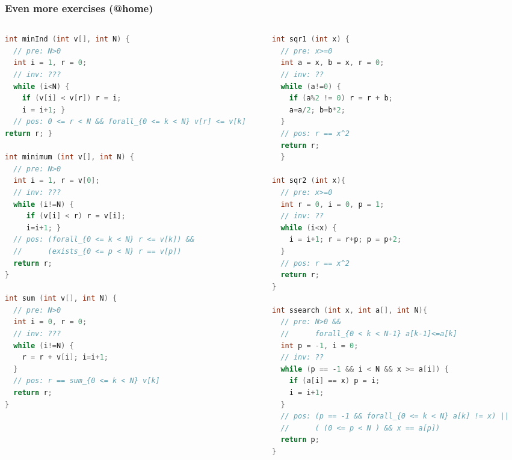 \documentclass[aspectratio=169]{beamer}
\begin{document}
\begin{frame}[fragile]\frametitle{Even more exercises (@home)}
\begin{columns}
\begin{column}{0.48\textwidth}
\begin{lstlisting}[language=C++,style=tiny]
int minInd (int v[], int N) {
  // pre: N>0
  int i = 1, r = 0;
  // inv: ???
  while (i<N) {
    if (v[i] < v[r]) r = i;
    i = i+1; }
  // pos: 0 <= r < N && forall_{0 <= k < N} v[r] <= v[k]
return r; }

int minimum (int v[], int N) {
  // pre: N>0
  int i = 1, r = v[0];
  // inv: ???
  while (i!=N) {
     if (v[i] < r) r = v[i];
     i=i+1; }
  // pos: (forall_{0 <= k < N} r <= v[k]) &&
  //      (exists_{0 <= p < N} r == v[p])
  return r;
}

int sum (int v[], int N) {
  // pre: N>0
  int i = 0, r = 0;
  // inv: ???
  while (i!=N) {
    r = r + v[i]; i=i+1;
  }
  // pos: r == sum_{0 <= k < N} v[k]
  return r;
}
\end{lstlisting}
\end{column}
\begin{column}{0.48\textwidth}
\begin{lstlisting}[language=C++,style=tiny]
int sqr1 (int x) {
  // pre: x>=0
  int a = x, b = x, r = 0;
  // inv: ??
  while (a!=0) {
    if (a%2 != 0) r = r + b;
    a=a/2; b=b*2;
  }
  // pos: r == x^2
  return r;
  }

int sqr2 (int x){
  // pre: x>=0
  int r = 0, i = 0, p = 1;
  // inv: ??
  while (i<x) {
    i = i+1; r = r+p; p = p+2;
  }
  // pos: r == x^2
  return r;
}

int ssearch (int x, int a[], int N){
  // pre: N>0 &&
  //      forall_{0 < k < N-1} a[k-1]<=a[k]
  int p = -1, i = 0;
  // inv: ??
  while (p == -1 && i < N && x >= a[i]) {
    if (a[i] == x) p = i;
    i = i+1;
  }
  // pos: (p == -1 && forall_{0 <= k < N} a[k] != x) ||
  //      ( (0 <= p < N ) && x == a[p])
  return p;
}
\end{lstlisting}
\end{column}
\end{columns}
\end{frame}



\end{document}

